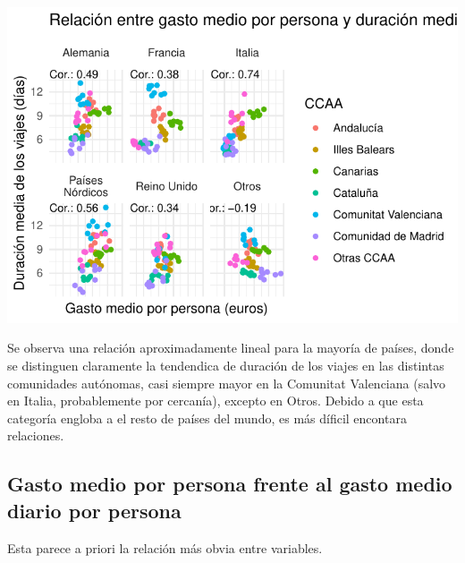 \documentclass[data,article,submit,moreauthors,pdftex]{Definitions/mdpi}
\begin{document}
\includegraphics{ProyectoAED2024_Rmd_files/figure-latex/unnamed-chunk-28-1.pdf}

Se observa una relación aproximadamente lineal para la mayoría de
países, donde se distinguen claramente la tendendica de duración de los
viajes en las distintas comunidades autónomas, casi siempre mayor en la
Comunitat Valenciana (salvo en Italia, probablemente por cercanía),
excepto en Otros. Debido a que esta categoría engloba a el resto de
países del mundo, es más díficil encontara relaciones.

\subsection{Gasto medio por persona frente al gasto medio diario por
persona}\label{gasto-medio-por-persona-frente-al-gasto-medio-diario-por-persona}

Esta parece a priori la relación más obvia entre variables.
\end{document}
